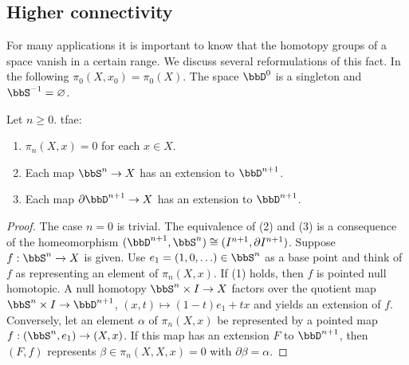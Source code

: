\subsection{Higher connectivity}

For many applications it is important to know that the homotopy groups of a space vanish in a certain range. We discuss several reformulations of this fact. In the following $\pi_0(X,x_0)=\pi_0(X)$. The space $\bbD^0$ is a singleton and $\bbS^{-1}=\varnothing$.

\begin{prop}\label{prop 6.7.1 tomDieck} 
Let $n\geq 0$. \gls{tfae}:
\begin{enumerate}
    \item $\pi_n(X,x)=0$ for each $x\in X$.
    \item Each map $\bbS^n\to X$ has an extension to $\bbD^{n+1}$.
    \item Each map $\partial \bbD^{n+1}\to X$ has an extension to $\bbD^{n+1}$.
\end{enumerate}
\end{prop}
\begin{proof}
    The case $n=0$ is trivial. The equivalence of (2) and (3) is a consequence of the homeomorphism $(\bbD^{n+1},\bbS^n)\cong(I^{n+1},\partial I^{n+1})$. Suppose $f:\bbS^n\to X$ is given. Use $e_1=(1,0,\ldots)\in \bbS^n$ as a base point and think of $f$ as representing an element of $\pi_n(X,x)$. If (1) holds, then $f$ is pointed null homotopic. A null homotopy $\bbS^n\times I\to X$ factors over the quotient map $\bbS^n\times I\to \bbD^{n+1}$, $(x,t)\mapsto (1-t)e_1+tx$ and yields an extension of $f$. Conversely, let an element $\alpha$ of $\pi_n(X,x)$ be represented by a pointed map $f:(\bbS^n,e_1)\to (X,x)$. If this map has an extension $F$ to $\bbD^{n+1}$, then $(F,f)$ represents $\beta\in \pi_n(X,X,x)=0$ with $\partial\beta=\alpha$.
\end{proof}

